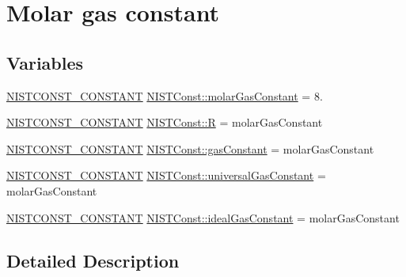 \hypertarget{group___n_i_s_t_const-_molar_gas_constant}{}\section{Molar gas constant}
\label{group___n_i_s_t_const-_molar_gas_constant}
\subsection*{Variables}
\begin{DoxyCompactItemize}
\item 
\mbox{\hyperlink{group___n_i_s_t_const-_macros_ga2b0fc1d7452373f816175dd86ce26729}{N\+I\+S\+T\+C\+O\+N\+S\+T\+\_\+\+C\+O\+N\+S\+T\+A\+NT}} \mbox{\hyperlink{group___n_i_s_t_const-_molar_gas_constant_gac728faac7d754d8ddca4a4bd7565ec0e}{N\+I\+S\+T\+Const\+::molar\+Gas\+Constant}} = 8.
\item 
\mbox{\hyperlink{group___n_i_s_t_const-_macros_ga2b0fc1d7452373f816175dd86ce26729}{N\+I\+S\+T\+C\+O\+N\+S\+T\+\_\+\+C\+O\+N\+S\+T\+A\+NT}} \mbox{\hyperlink{group___n_i_s_t_const-_molar_gas_constant_ga5396aa5ee203cc91bc415c59c14a79a3}{N\+I\+S\+T\+Const\+::R}} = molar\+Gas\+Constant
\item 
\mbox{\hyperlink{group___n_i_s_t_const-_macros_ga2b0fc1d7452373f816175dd86ce26729}{N\+I\+S\+T\+C\+O\+N\+S\+T\+\_\+\+C\+O\+N\+S\+T\+A\+NT}} \mbox{\hyperlink{group___n_i_s_t_const-_molar_gas_constant_gaede5054fb870899eca0b8c4b6ed2aed2}{N\+I\+S\+T\+Const\+::gas\+Constant}} = molar\+Gas\+Constant
\item 
\mbox{\hyperlink{group___n_i_s_t_const-_macros_ga2b0fc1d7452373f816175dd86ce26729}{N\+I\+S\+T\+C\+O\+N\+S\+T\+\_\+\+C\+O\+N\+S\+T\+A\+NT}} \mbox{\hyperlink{group___n_i_s_t_const-_molar_gas_constant_ga308d88479aad38c599c72dfca8a7b14f}{N\+I\+S\+T\+Const\+::universal\+Gas\+Constant}} = molar\+Gas\+Constant
\item 
\mbox{\hyperlink{group___n_i_s_t_const-_macros_ga2b0fc1d7452373f816175dd86ce26729}{N\+I\+S\+T\+C\+O\+N\+S\+T\+\_\+\+C\+O\+N\+S\+T\+A\+NT}} \mbox{\hyperlink{group___n_i_s_t_const-_molar_gas_constant_ga7de422ba1c8713e8e8596ac1e1da8646}{N\+I\+S\+T\+Const\+::ideal\+Gas\+Constant}} = molar\+Gas\+Constant
\end{DoxyCompactItemize}


\subsection{Detailed Description}


